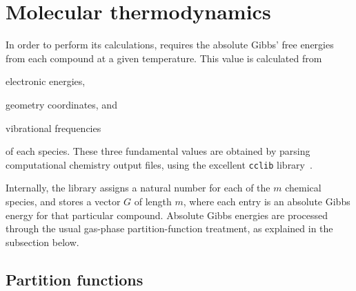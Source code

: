 \section{Molecular thermodynamics}

In order to perform its calculations,
\overreact{} requires the absolute Gibbs' free energies from each compound at a given temperature.
This value is calculated from
\begin{enumerate*}
	\item electronic energies,
	\item geometry coordinates,
	      and
	\item vibrational frequencies
\end{enumerate*}
of each species.
These three fundamental values are obtained
by parsing computational chemistry output files,
using the excellent \texttt{cclib} library~\cite{O_boyle_2008}.

Internally,
the library assigns a natural number for each of the $m$ chemical species,
and stores a vector $G$ of length $m$,
where each entry is an absolute Gibbs energy for that particular compound.
Absolute Gibbs energies are processed through the usual gas-phase partition-function treatment,
as explained in the subsection below.

\subsection{Partition functions}

